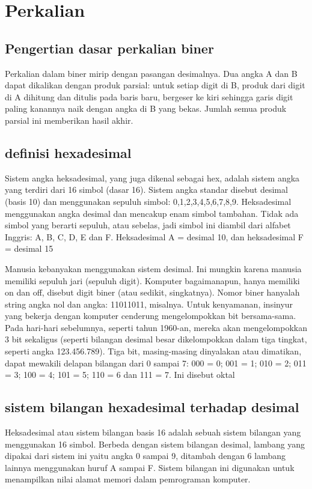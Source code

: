 \section{Perkalian}
\subsection{Pengertian dasar perkalian biner}
Perkalian dalam biner mirip dengan pasangan desimalnya. Dua angka A dan B dapat dikalikan dengan produk parsial: 
untuk setiap digit di B, produk dari digit di A dihitung dan ditulis pada baris baru, bergeser ke kiri sehingga 
garis digit paling kanannya naik dengan angka di B yang bekas. Jumlah semua produk parsial ini memberikan hasil akhir.

\subsection{definisi hexadesimal}
Sistem angka heksadesimal, yang juga dikenal sebagai hex, adalah sistem angka yang terdiri dari 16 simbol (dasar 16). 
Sistem angka standar disebut desimal (basis 10) dan menggunakan sepuluh simbol: 0,1,2,3,4,5,6,7,8,9. Heksadesimal 
menggunakan angka desimal dan mencakup enam simbol tambahan. Tidak ada simbol yang berarti sepuluh, atau sebelas, 
jadi simbol ini diambil dari alfabet Inggris: A, B, C, D, E dan F. Heksadesimal A = desimal 10, dan heksadesimal F = desimal 15

Manusia kebanyakan menggunakan sistem desimal. Ini mungkin karena manusia memiliki sepuluh jari (sepuluh digit). 
Komputer bagaimanapun, hanya memiliki on dan off, disebut digit biner (atau sedikit, singkatnya). Nomor biner 
hanyalah string angka nol dan angka: 11011011, misalnya. Untuk kenyamanan, insinyur yang bekerja dengan komputer 
cenderung mengelompokkan bit bersama-sama. Pada hari-hari sebelumnya, seperti tahun 1960-an, mereka akan mengelompokkan 
3 bit sekaligus (seperti bilangan desimal besar dikelompokkan dalam tiga tingkat, seperti angka 123.456.789). Tiga bit, 
masing-masing dinyalakan atau dimatikan, dapat mewakili delapan bilangan dari 0 sampai 7: 000 = 0; 001 = 1; 010 = 2;
011 = 3; 100 = 4; 101 = 5; 110 = 6 dan 111 = 7. Ini disebut oktal

\subsection{sistem bilangan hexadesimal terhadap desimal}
Heksadesimal atau sistem bilangan basis 16 adalah sebuah sistem bilangan yang menggunakan 16 simbol. Berbeda dengan sistem bilangan desimal, 
lambang yang dipakai dari sistem ini yaitu angka 0 sampai 9, ditambah dengan 6 lambang lainnya menggunakan huruf A sampai F. Sistem 
bilangan ini digunakan untuk menampilkan nilai alamat memori dalam pemrograman komputer.

